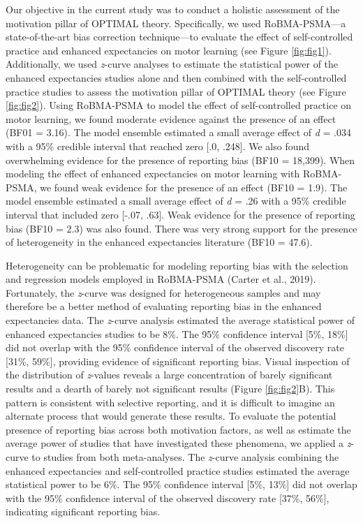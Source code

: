 \documentclass[
  doc, donotrepeattitle,floatsintext]{apa7}
\begin{document}
Our objective in the current study was to conduct a holistic assessment of the motivation pillar of OPTIMAL theory. Specifically, we used RoBMA-PSMA---a state-of-the-art bias correction technique---to evaluate the effect of self-controlled practice and enhanced expectancies on motor learning (see Figure \ref{fig:fig1}). Additionally, we used \emph{z}-curve analyses to estimate the statistical power of the enhanced expectancies studies alone and then combined with the self-controlled practice studies to assess the motivation pillar of OPTIMAL theory (see Figure \ref{fig:fig2}). Using RoBMA-PSMA to model the effect of self-controlled practice on motor learning, we found moderate evidence against the presence of an effect (BF01 = 3.16). The model ensemble estimated a small average effect of \emph{d} = .034 with a 95\% credible interval that reached zero {[}.0, .248{]}. We also found overwhelming evidence for the presence of reporting bias (BF10 = 18,399). When modeling the effect of enhanced expectancies on motor learning with RoBMA-PSMA, we found weak evidence for the presence of an effect (BF10 = 1.9). The model ensemble estimated a small average effect of \emph{d} = .26 with a 95\% credible interval that included zero {[}-.07, .63{]}. Weak evidence for the presence of reporting bias (BF10 = 2.3) was also found. There was very strong support for the presence of heterogeneity in the enhanced expectancies literature (BF10 = 47.6).

Heterogeneity can be problematic for modeling reporting bias with the selection and regression models employed in RoBMA-PSMA (Carter et al., 2019). Fortunately, the \emph{z}-curve was designed for heterogeneous samples and may therefore be a better method of evaluating reporting bias in the enhanced expectancies data. The \emph{z}-curve analysis estimated the average statistical power of enhanced expectancies studies to be 8\%. The 95\% confidence interval {[}5\%, 18\%{]} did not overlap with the 95\% confidence interval of the observed discovery rate {[}31\%, 59\%{]}, providing evidence of significant reporting bias. Visual inspection of the distribution of \emph{z}-values reveals a large concentration of barely significant results and a dearth of barely not significant results (Figure \ref{fig:fig2}B). This pattern is consistent with selective reporting, and it is difficult to imagine an alternate process that would generate these results. To evaluate the potential presence of reporting bias across both motivation factors, as well as estimate the average power of studies that have investigated these phenomena, we applied a \emph{z}-curve to studies from both meta-analyses. The \emph{z}-curve analysis combining the enhanced expectancies and self-controlled practice studies estimated the average statistical power to be 6\%. The 95\% confidence interval {[}5\%, 13\%{]} did not overlap with the 95\% confidence interval of the observed discovery rate {[}37\%, 56\%{]}, indicating significant reporting bias.
\end{document}
